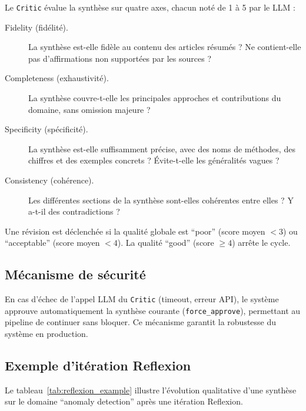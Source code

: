 Le \texttt{Critic} évalue la synthèse sur quatre axes, chacun noté de
1 à 5 par le LLM :

\begin{description}
  \item[Fidelity (fidélité).] La synthèse est-elle fidèle au contenu
    des articles résumés ? Ne contient-elle pas d'affirmations non
    supportées par les sources ?
  \item[Completeness (exhaustivité).] La synthèse couvre-t-elle les
    principales approches et contributions du domaine, sans omission
    majeure ?
  \item[Specificity (spécificité).] La synthèse est-elle suffisamment
    précise, avec des noms de méthodes, des chiffres et des exemples
    concrets ? Évite-t-elle les généralités vagues ?
  \item[Consistency (cohérence).] Les différentes sections de la synthèse
    sont-elles cohérentes entre elles ? Y a-t-il des contradictions ?
\end{description}

Une révision est déclenchée si la qualité globale est ``poor'' (score
moyen $< 3$) ou ``acceptable'' (score moyen $< 4$).
La qualité ``good'' (score $\geq 4$) arrête le cycle.

\subsection{Mécanisme de sécurité}

En cas d'échec de l'appel LLM du \texttt{Critic} (timeout, erreur API),
le système approuve automatiquement la synthèse courante (\texttt{force\_approve}),
permettant au pipeline de continuer sans bloquer. Ce mécanisme garantit
la robustesse du système en production.

\subsection{Exemple d'itération Reflexion}

Le tableau~\ref{tab:reflexion_example} illustre l'évolution qualitative
d'une synthèse sur le domaine ``anomaly detection'' après une itération
Reflexion.

